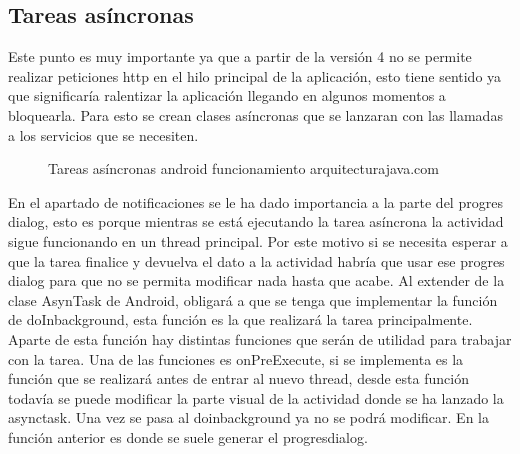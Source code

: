 \subsection{Tareas asíncronas}
\label{subsecc:Tareas asíncronas}

Este punto es muy importante ya que a partir de la versión 4 no se permite realizar peticiones http en el hilo principal de la aplicación, esto tiene sentido ya que significaría ralentizar la aplicación llegando en algunos momentos a bloquearla.
Para esto se crean clases asíncronas que se lanzaran con las llamadas a los servicios que se necesiten.
\newpage
\begin{figure}[H] 
  \begin{center} 
    \caption{Tareas asíncronas android funcionamiento arquitecturajava.com} 
    \label{fig:TareasAsincronas} 
  \end{center} 
\end{figure}

En el apartado de notificaciones se le ha dado importancia a la parte del progres dialog, esto es porque mientras se está ejecutando la tarea asíncrona la actividad sigue funcionando en un thread principal. Por este motivo si se necesita esperar a que la tarea finalice y devuelva el dato a la actividad habría que usar ese progres dialog para que no se permita modificar nada hasta que acabe.
Al extender de la clase AsynTask de Android, obligará a que se tenga que implementar la función de doInbackground, esta función es la que realizará la tarea principalmente.
Aparte de esta función hay distintas funciones que serán de utilidad para trabajar con la tarea.
Una de las funciones es onPreExecute, si se implementa es la función que se realizará antes de entrar al nuevo thread, desde esta función todavía se puede modificar la parte visual de la actividad donde se ha lanzado la asynctask. Una vez se pasa al doinbackground ya no se podrá modificar.
En la función anterior es donde se suele generar el progresdialog.


